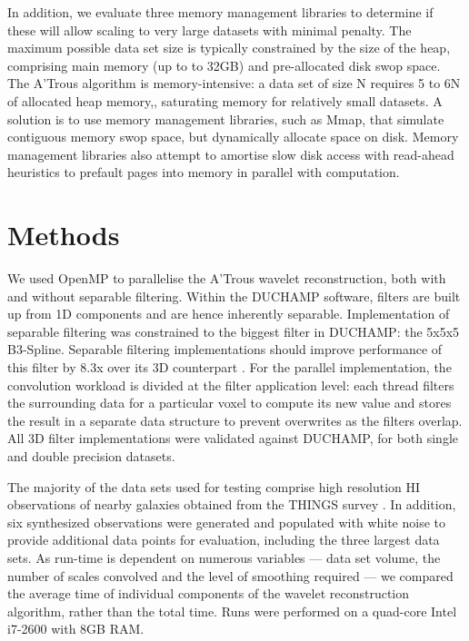 \documentclass[11pt, twoside]{article}
\begin{document}
In addition, we evaluate three memory management libraries to determine if these will allow scaling to very large datasets with minimal penalty.
The maximum possible data set size is typically constrained by the size of the heap, comprising main memory (up to to 32GB) and pre-allocated disk swop space.  The A'Trous algorithm is memory-intensive: a data set of size N requires 5 to 6N of allocated heap memory,, saturating memory for relatively small datasets.
A solution  is to use memory management libraries, such as Mmap\citep{mmap2012},
that simulate contiguous memory swop space, but dynamically allocate space on disk.
Memory management libraries also attempt to amortise slow disk access with read-ahead heuristics to prefault pages into memory in parallel with computation.



\section{Methods}

We used OpenMP to parallelise the  A'Trous wavelet reconstruction, both with and without separable filtering.  Within the DUCHAMP software, filters are built up from 1D components and are hence inherently separable.  Implementation of separable filtering was constrained to the biggest filter in DUCHAMP: the  5x5x5 B3-Spline.
Separable filtering implementations should  improve performance of this filter by 8.3x over its 3D counterpart \citep{Solomon2010}.
For the parallel implementation, the convolution workload is divided at the filter application level: each  thread filters the surrounding data for a particular voxel to compute its new value and stores the result in
a separate data structure to prevent overwrites as the filters overlap.  All  3D filter implementations were validated against  DUCHAMP, for both single and double precision datasets.

The majority of the data sets used for testing comprise high resolution HI observations of nearby galaxies obtained from the THINGS survey \citep{Walter2008}.
In addition, six synthesized observations were generated and populated with white noise to provide additional data points for evaluation, including the three largest data sets. As run-time is dependent on numerous variables ---  data set volume, the number of scales convolved  and the level of smoothing required ---
we compared the average time of  individual components of the wavelet reconstruction algorithm, rather than the total time.  Runs were performed on a quad-core Intel i7-2600 with 8GB RAM.
\end{document}
